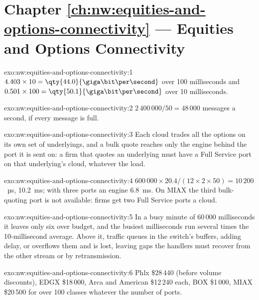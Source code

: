 \section*{Chapter \ref{ch:nw:equities-and-options-connectivity} --- Equities and Options Connectivity}

\begin{solution}{exo:nw:equities-and-options-connectivity:1}
$4.403 \times 10 = \qty{44.0}{\giga\bit\per\second}$ over 100 milliseconds and $0.501 \times 100 = \qty{50.1}{\giga\bit\per\second}$ over
10 milliseconds.
\end{solution}

\begin{solution}{exo:nw:equities-and-options-connectivity:2}
$2\,400\,000/50 = 48\,000$ messages a second, if every message is full.
\end{solution}

\begin{solution}{exo:nw:equities-and-options-connectivity:3}
Each cloud trades all the options on its own set of underlyings, and a bulk quote reaches only the engine behind the port it is sent
on: a firm that quotes an underlying must have a Full Service port on that underlying's cloud, whatever the load.
\end{solution}

\begin{solution}{exo:nw:equities-and-options-connectivity:4}
$600\,000 \times 20.4/(12 \times 2 \times 50) = 10\,200$~µs, \qty{10.2}{\milli\second}; with three ports an engine
\qty{6.8}{\milli\second}. On MIAX the third bulk-quoting port is not available: firms get two Full Service ports a cloud.
\end{solution}

\begin{solution}{exo:nw:equities-and-options-connectivity:5}
In a busy minute of 60\,000 milliseconds it leaves only six over budget, and the busiest milliseconds run several times the
10-millisecond average. Above it, traffic queues in the switch's buffers, adding delay, or overflows them and is lost, leaving gaps
the handlers must recover from the other stream or by retransmission.
\end{solution}

\begin{solution}{exo:nw:equities-and-options-connectivity:6}
Phlx \$28\,440 (before volume discounts), EDGX \$18\,000, Arca and American \$12\,240 each, BOX \$1\,000, MIAX \$20\,500 for over 100
classes whatever the number of ports.
\end{solution}

